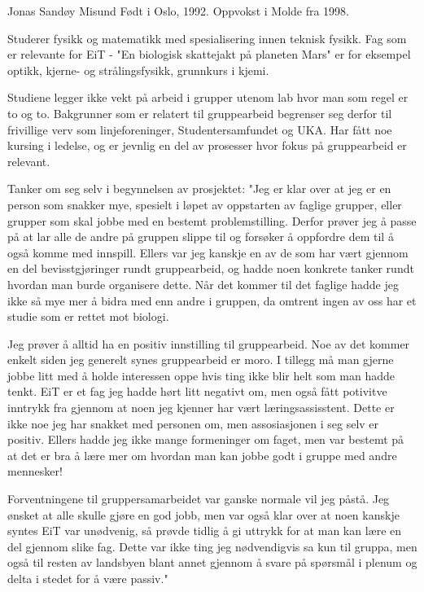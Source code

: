 Jonas Sandøy Misund
Født i Oslo, 1992.
Oppvokst i Molde fra 1998.

Studerer fysikk og matematikk med spesialisering innen teknisk fysikk.
Fag som er relevante for EiT - "En biologisk skattejakt på planeten Mars" er for eksempel optikk, kjerne- og strålingsfysikk, grunnkurs i kjemi.

Studiene legger ikke vekt på arbeid i grupper utenom lab hvor man som regel er to og to.
Bakgrunner som er relatert til gruppearbeid begrenser seg derfor til frivillige verv som linjeforeninger, Studentersamfundet og UKA.
Har fått noe kursing i ledelse, og er jevnlig en del av prosesser hvor fokus på gruppearbeid er relevant.

Tanker om seg selv i begynnelsen av prosjektet:
"Jeg er klar over at jeg er en person som snakker mye, spesielt i løpet av oppstarten av faglige grupper, eller grupper som skal jobbe med en bestemt problemstilling.
Derfor prøver jeg å passe på at lar alle de andre på gruppen slippe til og forsøker å oppfordre dem til å også komme med innspill.
Ellers var jeg kanskje en av de som har vært gjennom en del bevisstgjøringer rundt gruppearbeid, og hadde noen konkrete tanker rundt hvordan man burde organisere dette.
Når det kommer til det faglige hadde jeg ikke så mye mer å bidra med enn andre i gruppen, da omtrent ingen av oss har et studie som er rettet mot biologi.

Jeg prøver å alltid ha en positiv innstilling til gruppearbeid.
Noe av det kommer enkelt siden jeg generelt synes gruppearbeid er moro.
I tillegg må man gjerne jobbe litt med å holde interessen oppe hvis ting ikke blir helt som man hadde tenkt.
EiT er et fag jeg hadde hørt litt negativt om, men også fått potivitve inntrykk fra gjennom at noen jeg kjenner har vært læringsassisstent.
Dette er ikke noe jeg har snakket med personen om, men assosiasjonen i seg selv er positiv.
Ellers hadde jeg ikke mange formeninger om faget, men var bestemt på at det er bra å lære mer om hvordan man kan jobbe godt i gruppe med andre mennesker!

Forventningene til gruppersamarbeidet var ganske normale vil jeg påstå.
Jeg ønsket at alle skulle gjøre en god jobb, men var også klar over at noen kanskje syntes EiT var unødvenig, så prøvde tidlig å gi uttrykk for at man kan lære en del gjennom slike fag.
Dette var ikke ting jeg nødvendigvis sa kun til gruppa, men også til resten av landsbyen blant annet gjennom å svare på spørsmål i plenum og delta i stedet for å være passiv."